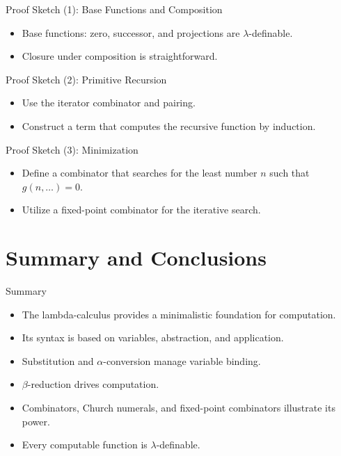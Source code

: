 \documentclass{beamer}
\begin{document}
\begin{frame}{Proof Sketch (1): Base Functions and Composition}
  \begin{itemize}
    \item Base functions: zero, successor, and projections are \(\lambda\)-definable.
    \item Closure under composition is straightforward.
  \end{itemize}
\end{frame}

\begin{frame}{Proof Sketch (2): Primitive Recursion}
  \begin{itemize}
    \item Use the iterator combinator and pairing.
    \item Construct a term that computes the recursive function by induction.
  \end{itemize}
\end{frame}

\begin{frame}{Proof Sketch (3): Minimization}
  \begin{itemize}
    \item Define a combinator that searches for the least number \(n\) such that \(g(n,\dots)=0\).
    \item Utilize a fixed-point combinator for the iterative search.
  \end{itemize}
\end{frame}

\section{Summary and Conclusions}
\begin{frame}{Summary}
  \begin{itemize}
    \item The lambda-calculus provides a minimalistic foundation for computation.
    \item Its syntax is based on variables, abstraction, and application.
    \item Substitution and $\alpha$-conversion manage variable binding.
    \item $\beta$-reduction drives computation.
    \item Combinators, Church numerals, and fixed-point combinators illustrate its power.
    \item Every computable function is $\lambda$-definable.
  \end{itemize}
\end{frame}
\end{document}
